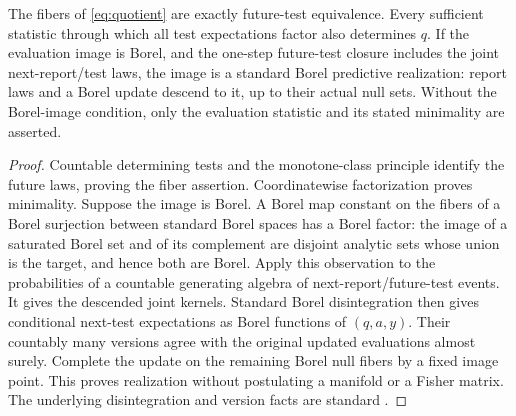 \begin{proposition}\label{prop:quotient}
The fibers of \eqref{eq:quotient} are exactly future-test equivalence. Every sufficient statistic through which all test expectations factor also determines $q$. If the evaluation image is Borel, and the one-step future-test closure includes the joint next-report/test laws, the image is a standard Borel predictive realization: report laws and a Borel update descend to it, up to their actual null sets. Without the Borel-image condition, only the evaluation statistic and its stated minimality are asserted.
\end{proposition}
\begin{proof}
Countable determining tests and the monotone-class principle identify the future laws, proving the fiber assertion. Coordinatewise factorization proves minimality. Suppose the image is Borel. A Borel map constant on the fibers of a Borel surjection between standard Borel spaces has a Borel factor: the image of a saturated Borel set and of its complement are disjoint analytic sets whose union is the target, and hence both are Borel. Apply this observation to the probabilities of a countable generating algebra of next-report/future-test events. It gives the descended joint kernels. Standard Borel disintegration then gives conditional next-test expectations as Borel functions of $(q,a,y)$. Their countably many versions agree with the original updated evaluations almost surely. Complete the update on the remaining Borel null fibers by a fixed image point. This proves realization without postulating a manifold or a Fisher matrix. The underlying disintegration and version facts are standard \cite{Kallenberg,BertsekasShreve}.
\end{proof}
